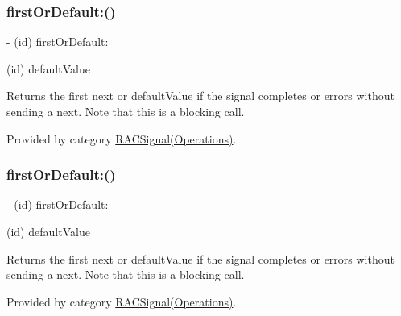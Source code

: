 \subsubsection{\texorpdfstring{first\+Or\+Default\+:()}{firstOrDefault:()}\hspace{0.1cm}{\footnotesize\ttfamily [1/3]}}
{\footnotesize\ttfamily -\/ (id) first\+Or\+Default\+: \begin{DoxyParamCaption}\item[{(id)}]{default\+Value }\end{DoxyParamCaption}}

Returns the first {\ttfamily next} or {\ttfamily default\+Value} if the signal completes or errors without sending a {\ttfamily next}. Note that this is a blocking call. 

Provided by category \mbox{\hyperlink{category_r_a_c_signal_07_operations_08_a51f980781f2dc9e662278d7db7b0cd38}{R\+A\+C\+Signal(\+Operations)}}.

\mbox{\label{interface_r_a_c_signal_a51f980781f2dc9e662278d7db7b0cd38}} 
\subsubsection{\texorpdfstring{first\+Or\+Default\+:()}{firstOrDefault:()}\hspace{0.1cm}{\footnotesize\ttfamily [2/3]}}
{\footnotesize\ttfamily -\/ (id) first\+Or\+Default\+: \begin{DoxyParamCaption}\item[{(id)}]{default\+Value }\end{DoxyParamCaption}}

Returns the first {\ttfamily next} or {\ttfamily default\+Value} if the signal completes or errors without sending a {\ttfamily next}. Note that this is a blocking call. 

Provided by category \mbox{\hyperlink{category_r_a_c_signal_07_operations_08_a51f980781f2dc9e662278d7db7b0cd38}{R\+A\+C\+Signal(\+Operations)}}.

\mbox{\label{interface_r_a_c_signal_a51f980781f2dc9e662278d7db7b0cd38}} 
